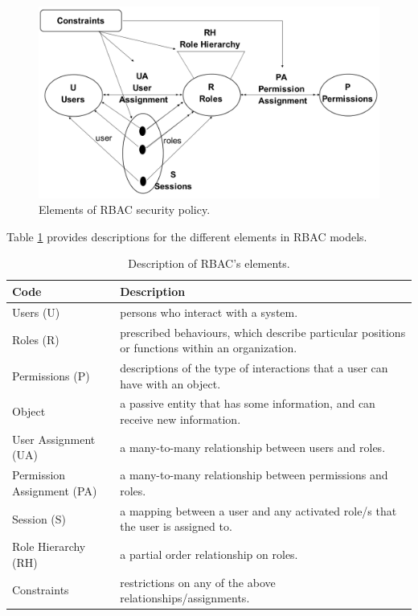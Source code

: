 \begin{figure}[bht]
\centering
\includegraphics[scale=0.25]{RBACelements.png}
\caption{Elements of RBAC security policy.}
\label{fig:elelmRBAC}
\end{figure}



Table \ref{tab:elements} provides descriptions for the different elements in RBAC models.

\begin{table}[bth]
\centering
\caption{Description of RBAC's elements.}
\small
{}
\begin{tabular}{p{1.6 in} p{5.2 in}} \hline 
\hline
Code & Description\\\hline

Users (U)&  persons who interact with a system.\\
Roles (R)& prescribed behaviours, which describe particular positions or functions within an organization. \\
Permissions (P)& descriptions of the type of interactions that a user can have with an object.\\
Object& a passive entity that has some information, and   can receive new information.\\
User Assignment (UA)&a many-to-many relationship between users and roles.\\
Permission Assignment (PA)& a many-to-many relationship between permissions and roles.\\
Session (S)& a mapping between a user and any activated role/s that the user is assigned to.\\
Role Hierarchy (RH)& a partial order relationship on roles.\\
Constraints&restrictions on any of the above relationships/assignments.  \\ \hline\hline

\end{tabular}
\label{tab:elements}


\end{table}


